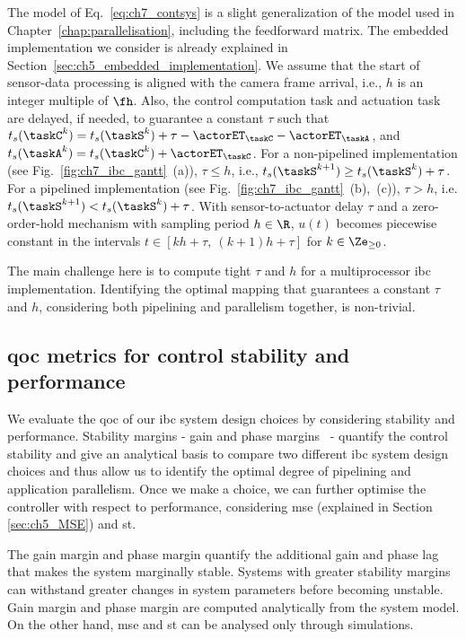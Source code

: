 The model of Eq.\ \ref{eq:ch7_contsys} is a slight generalization of the model used in Chapter~\ref{chap:parallelisation}, including the feedforward matrix. The embedded implementation we consider is already explained in Section~\ref{sec:ch5_embedded_implementation}.
We assume that the start of sensor-data processing is aligned with the camera frame arrival, i.e., $h$ is an integer multiple of $\fh$. Also, the control computation task and actuation task are delayed, if needed, to guarantee a constant $\tau$ such that $t_s(\taskC^k) = t_s(\taskS^k)+\tau-\actorET_\taskC-\actorET_\taskA$, and $t_s(\taskA^k) = t_s(\taskC^k) + \actorET_\taskC$.
For a non-pipelined implementation (see Fig.~\ref{fig:ch7_ibc_gantt}~(a)), $\tau \le h$, i.e., $t_s(\taskS^{k+1}) \ge t_s(\taskS^k) + \tau$.
For a pipelined implementation (see Fig.~\ref{fig:ch7_ibc_gantt}~(b),~(c)), $\tau > h$, i.e. $t_s(\taskS^{k+1}) < t_s(\taskS^k) + \tau$.
With sensor-to-actuator delay $\tau$ and a zero-order-hold mechanism with sampling period $h \in \R$, $u(t)$ becomes piecewise constant in the intervals $t \in [kh + \tau,\ (k + 1)h + \tau ]$ for $k \in \Ze_{\geq 0}$.

The main challenge here is to compute tight $\tau$ and $h$ for a multiprocessor \gls{ibc} implementation.
Identifying the optimal mapping that guarantees a constant $\tau$ and $h$, considering both pipelining and parallelism together, is non-trivial.

\subsection{\texorpdfstring{\Gls{qoc}}{QoC} metrics for control stability and performance}
\label{sec:ch7_QoC_metrics}
We evaluate the \gls{qoc} of our \gls{ibc} system design choices by considering stability and performance.
Stability margins - gain and phase margins~\cite{12_sunstability} - quantify the control stability and give an analytical basis to compare two different \gls{ibc} system design choices and thus allow us to identify the optimal degree of pipelining and application parallelism.
Once we make a choice, we can further optimise the controller with respect to performance, considering \gls{mse} (explained in Section \ref{sec:ch5_MSE}) and \gls{st}.

The gain margin and phase margin quantify the additional gain and phase lag that makes the system marginally stable.
Systems with greater stability margins can withstand greater changes in system parameters before becoming unstable.
Gain margin and phase margin are computed analytically from the system model.
On the other hand, \gls{mse} and \gls{st} can be analysed only through simulations.

